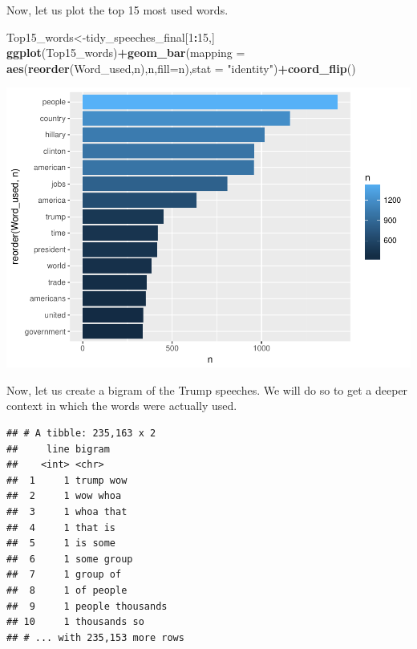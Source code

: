 \documentclass[]{article}
\newenvironment{Shaded}{\begin{snugshade}}{\end{snugshade}}
\newcommand{\KeywordTok}[1]{\textcolor[rgb]{0.13,0.29,0.53}{\textbf{#1}}}
\newcommand{\DataTypeTok}[1]{\textcolor[rgb]{0.13,0.29,0.53}{#1}}
\newcommand{\DecValTok}[1]{\textcolor[rgb]{0.00,0.00,0.81}{#1}}
\newcommand{\StringTok}[1]{\textcolor[rgb]{0.31,0.60,0.02}{#1}}
\newcommand{\OperatorTok}[1]{\textcolor[rgb]{0.81,0.36,0.00}{\textbf{#1}}}
\newcommand{\NormalTok}[1]{#1}
\begin{document}
Now, let us plot the top 15 most used words.

\begin{Shaded}
\begin{Highlighting}[]
\NormalTok{Top15_words<-tidy_speeches_final[}\DecValTok{1}\OperatorTok{:}\DecValTok{15}\NormalTok{,]}
\KeywordTok{ggplot}\NormalTok{(Top15_words)}\OperatorTok{+}\KeywordTok{geom_bar}\NormalTok{(}\DataTypeTok{mapping =} \KeywordTok{aes}\NormalTok{(}\KeywordTok{reorder}\NormalTok{(Word_used,n),n,}\DataTypeTok{fill=}\NormalTok{n),}\DataTypeTok{stat =} \StringTok{"identity"}\NormalTok{)}\OperatorTok{+}\KeywordTok{coord_flip}\NormalTok{()}
\end{Highlighting}
\end{Shaded}

\includegraphics{Donald_Trump_Speech_sentiment_analysis_files/figure-latex/unnamed-chunk-20-1.pdf}

Now, let us create a bigram of the Trump speeches. We will do so to get
a deeper context in which the words were actually used.

\begin{Shaded}
\end{Shaded}

\begin{verbatim}
## # A tibble: 235,163 x 2
##     line bigram          
##    <int> <chr>           
##  1     1 trump wow       
##  2     1 wow whoa        
##  3     1 whoa that       
##  4     1 that is         
##  5     1 is some         
##  6     1 some group      
##  7     1 group of        
##  8     1 of people       
##  9     1 people thousands
## 10     1 thousands so    
## # ... with 235,153 more rows
\end{verbatim}
\end{document}
